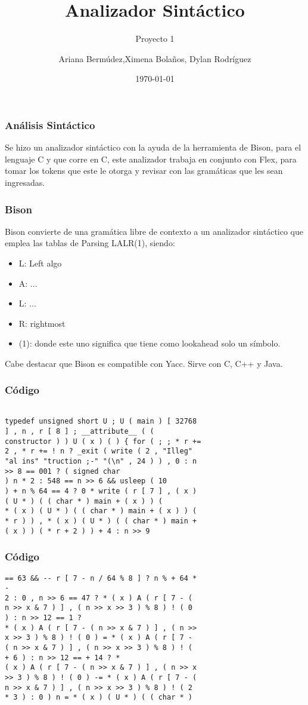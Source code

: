 \documentclass{beamer}
\title{Analizador Sint\'actico}
\subtitle{Proyecto 1}
\author{Ariana Berm\'udez,Ximena Bola\~nos, Dylan Rodr\'iguez}
\institute{Instituto Tecnol\'ogico de Costa Rica}
\date{\today}
\begin{document}
\begin{frame}
 \titlepage 
 \end{frame}\begin{frame}
 \frametitle{An\'alisis Sint\'actico}
  Se hizo un analizador sint\'actico con la ayuda de la herramienta de Bison, para el lenguaje C y que corre en C, este analizador trabaja en conjunto con Flex, para tomar los tokens que este le otorga y revisar con las gram\'aticas que les sean ingresadas. \end{frame}\begin{frame}
 \frametitle{Bison}
 Bison convierte de una gram\'atica libre de contexto a un analizador sint\'actico que emplea las tablas de Parsing LALR(1), siendo: \begin{itemize} \item L: Left algo \item A: ... \item L: ... \item R: rightmost \item (1): donde este uno significa que tiene como lookahead solo un s\'imbolo. \end{itemize} Cabe destacar que Bison es compatible con Yacc. Sirve con C, C++ y Java. \end{frame}\begin{frame}[fragile]
\frametitle{C\'odigo}
\begin{verbatim}

typedef unsigned short U ; U ( main ) [ 32768 
] , n , r [ 8 ] ; __attribute__ ( ( 
constructor ) ) U ( x ) ( ) { for ( ; ; * r += 
2 , * r += ! n ? _exit ( write ( 2 , "Illeg" 
"al ins" "truction ;-" "(\n" , 24 ) ) , 0 : n 
>> 8 == 001 ? ( signed char 
) n * 2 : 548 == n >> 6 && usleep ( 10 
) + n % 64 == 4 ? 0 * write ( r [ 7 ] , ( x ) 
( U * ) ( ( char * ) main + ( x ) ) ( 
* ( x ) ( U * ) ( ( char * ) main + ( x ) ) ( 
* r ) ) , * ( x ) ( U * ) ( ( char * ) main + 
( x ) ) ( * r + 2 ) ) + 4 : n >> 9 
\end{verbatim}
\end{frame}
\begin{frame}[fragile]
\frametitle{C\'odigo}
\begin{verbatim}
== 63 && -- r [ 7 - n / 64 % 8 ] ? n % + 64 * 
- 
2 : 0 , n >> 6 == 47 ? * ( x ) A ( r [ 7 - ( 
n >> x & 7 ) ] , ( n >> x >> 3 ) % 8 ) ! ( 0 
) : n >> 12 == 1 ? 
* ( x ) A ( r [ 7 - ( n >> x & 7 ) ] , ( n >> 
x >> 3 ) % 8 ) ! ( 0 ) = * ( x ) A ( r [ 7 - 
( n >> x & 7 ) ] , ( n >> x >> 3 ) % 8 ) ! ( 
+ 6 ) : n >> 12 == + 14 ? * 
( x ) A ( r [ 7 - ( n >> x & 7 ) ] , ( n >> x 
>> 3 ) % 8 ) ! ( 0 ) -= * ( x ) A ( r [ 7 - ( 
n >> x & 7 ) ] , ( n >> x >> 3 ) % 8 ) ! ( 2 
* 3 ) : 0 ) n = * ( x ) ( U * ) ( ( char * ) 
\end{verbatim}
\end{frame}
\end{document}
